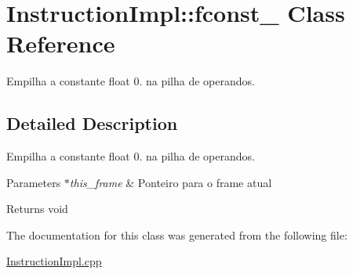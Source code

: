 \hypertarget{class_instruction_impl_1_1fconst__0}{}\section{Instruction\+Impl\+:\+:fconst\+\_ Class Reference}
\label{class_instruction_impl_1_1fconst__0}


Empilha a constante float 0. na pilha de operandos.  




\subsection{Detailed Description}
Empilha a constante float 0. na pilha de operandos. 


\begin{DoxyParams}{Parameters}
{\em $\ast$this\+\_\+frame} & Ponteiro para o frame atual \\
\hline
\end{DoxyParams}
\begin{DoxyReturn}{Returns}
void 
\end{DoxyReturn}


The documentation for this class was generated from the following file\+:\begin{DoxyCompactItemize}
\item 
\hyperlink{_instruction_impl_8cpp}{Instruction\+Impl.\+cpp}\end{DoxyCompactItemize}
